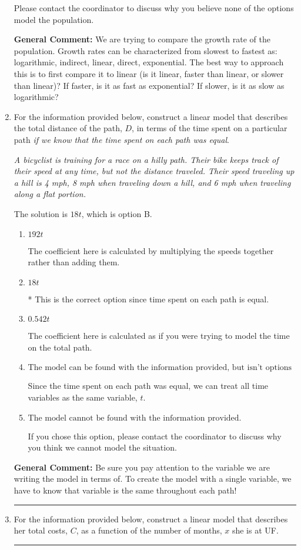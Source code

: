 \documentclass{extbook}[14pt]
\newcommand{\litem}[1]{\item #1

\rule{\textwidth}{0.4pt}}
\begin{document}
\begin{enumerate}
{\begin{enumerate}[label=\Alph*.]
Please contact the coordinator to discuss why you believe none of the options model the population.
\end{enumerate}

\textbf{General Comment:} We are trying to compare the growth rate of the population. Growth rates can be characterized from slowest to fastest as: logarithmic, indirect, linear, direct, exponential. The best way to approach this is to first compare it to linear (is it linear, faster than linear, or slower than linear)? If faster, is it as fast as exponential? If slower, is it as slow as logarithmic?
}
\litem{
For the information provided below, construct a linear model that describes the total distance of the path, $D$, in terms of the time spent on a particular path \textit{if we know that the time spent on each path was equal}.

\begin{center}
    \textit{ A bicyclist is training for a race on a hilly path. Their bike keeps track of their speed at any time, but not the distance traveled. Their speed traveling up a hill is 4 mph, 8 mph when traveling down a hill, and 6 mph when traveling along a flat portion. }
\end{center}
The solution is \( 18 t \), which is option B.\begin{enumerate}[label=\Alph*.]
\item \( 192 t \)

The coefficient here is calculated by multiplying the speeds together rather than adding them.
\item \( 18 t \)

* This is the correct option since time spent on each path is equal.
\item \( 0.542 t \)

The coefficient here is calculated as if you were trying to model the time on the total path.
\item \( \text{The model can be found with the information provided, but isn't options 1-3.} \)

Since the time spent on each path was equal, we can treat all time variables as the same variable, $t$.
\item \( \text{The model cannot be found with the information provided.} \)

If you chose this option, please contact the coordinator to discuss why you think we cannot model the situation.
\end{enumerate}

\textbf{General Comment:} Be sure you pay attention to the variable we are writing the model in terms of. To create the model with a single variable, we have to know that variable is the same throughout each path!
}
\litem{
For the information provided below, construct a linear model that describes her total costs, $C$, as a function of the number of months, $x$ she is at UF. 

}
\end{enumerate}
\end{document}
